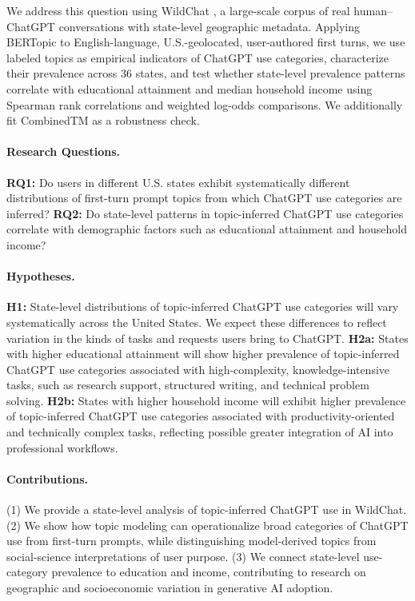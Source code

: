 \documentclass[11pt]{article}
\begin{document}
We address this question using WildChat \citep{zhao2024wildchat}, a large-scale corpus of real human--ChatGPT conversations with state-level geographic metadata. Applying BERTopic \citep{grootendorst2022bertopic} to English-language, U.S.-geolocated, user-authored first turns, we use labeled topics as empirical indicators of ChatGPT use categories,
characterize their prevalence across 36 states, and test whether state-level prevalence patterns correlate with educational attainment and median household income using Spearman rank correlations and weighted log-odds comparisons. We additionally fit CombinedTM \citep{bianchi2021pretraining} as a robustness check.

\paragraph{Research Questions.}

\textbf{RQ1:} Do users in different U.S. states exhibit systematically different distributions of first-turn prompt topics from which ChatGPT use categories are inferred?
\textbf{RQ2:} Do state-level patterns in topic-inferred ChatGPT use categories correlate with demographic factors such as educational attainment and household income?

\paragraph{Hypotheses.}

\textbf{H1:} State-level distributions of topic-inferred ChatGPT use categories will vary systematically across the United States. We expect these differences to reflect variation in the kinds of tasks and requests users bring to ChatGPT.
\textbf{H2a:} States with higher educational attainment will show higher prevalence of topic-inferred ChatGPT use categories associated with high-complexity, knowledge-intensive tasks, such as research support, structured writing, and technical problem solving.
\textbf{H2b:} States with higher household income will exhibit higher prevalence of topic-inferred ChatGPT use categories associated with productivity-oriented and technically complex tasks, reflecting possible greater integration of AI into professional workflows.

\paragraph{Contributions.}

(1) We provide a state-level analysis of topic-inferred ChatGPT use in WildChat.
(2) We show how topic modeling can operationalize broad categories of ChatGPT use from first-turn prompts, while distinguishing model-derived topics from social-science interpretations of user purpose.
(3) We connect state-level use-category prevalence to education and income, contributing to research on geographic and socioeconomic variation in generative AI adoption.
\end{document}
